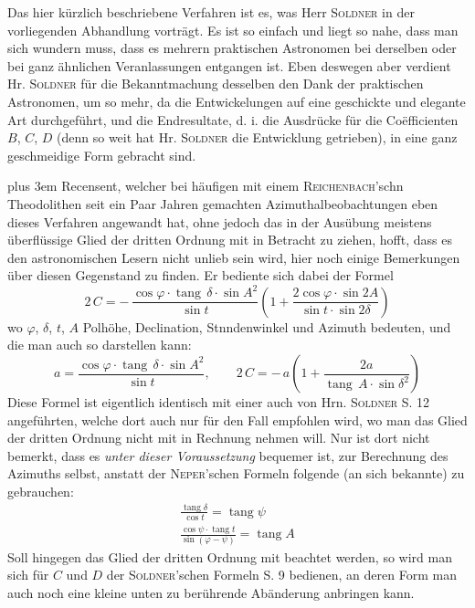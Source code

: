 Das hier kürzlich beschriebene Verfahren ist es, was Herr \textsc{Soldner} in der vorliegenden Abhandlung vorträgt. Es ist so einfach und liegt so nahe, dass man sich wundern muss, dass es mehrern praktischen Astronomen bei derselben oder bei ganz ähnlichen Veranlassungen entgangen ist. Eben deswegen aber verdient Hr. \textsc{Soldner} für die Bekanntmachung desselben den Dank der praktischen Astronomen, um so mehr, da die Entwickelungen auf eine geschickte und elegante Art durchgeführt, und die Endresultate, d. i. die Ausdrücke für die Coëfficienten $B$, $C$, $D$ (denn so weit hat Hr. \textsc{Soldner} die Entwicklung getrieben), in eine ganz geschmeidige Form gebracht sind.

\begingroup\rightskip=0pt plus 3em
Recensent, welcher bei häufigen mit einem \textsc{Reichenbach}'schn
 Theodolithen seit ein Paar Jahren gemachten Azimuthalbeobachtungen eben dieses Verfahren angewandt hat, ohne jedoch das in der Ausübung meistens überflüssige Glied der dritten Ordnung mit in Betracht zu ziehen, hofft, dass es den astronomischen Lesern nicht unlieb sein wird, hier noch einige Bemerkungen über diesen Gegenstand zu finden. Er bediente sich dabei der Formel
\[
2\,C = -\,\frac{\cos\varphi\cdot \operatorname{tang}\,\delta\cdot \sin A^2}{\sin t}
\left(1 + \frac{2\cos\varphi\cdot \sin 2A}{\sin t\cdot \sin 2\delta}\right)
\]
wo $\varphi$, $\delta$, $t$, $A$ Polhöhe, Declination, Stnndenwinkel
 und Azimuth bedeuten, und die man auch so darstellen kann:
\[
a = \frac{\cos\varphi\cdot \operatorname{tang}\,\delta\cdot \sin A^2}{\sin t}, \qquad
2\,C = -\,a\left(1 + \frac{2a}{\operatorname{tang}\,A\cdot \sin\delta^2}\right)
\]
Diese Formel ist eigentlich identisch mit einer auch von Hrn. \textsc{Soldner} S. 12 angeführten, welche dort auch nur für den Fall empfohlen wird, wo man das Glied der dritten Ordnung nicht mit in Rechnung nehmen will. Nur ist dort nicht bemerkt, dass es \emph{unter dieser Voraussetzung} bequemer ist, zur Berechnung des Azimuths selbst, anstatt der \textsc{Neper}'schen Formeln folgende (an sich bekannte) zu gebrauchen:
\[
\begin{gathered}
\frac{\operatorname{tang}\delta}{\cos t}=\operatorname{tang}\psi\\[5pt]
\frac{\cos\psi\cdot\operatorname{tang}t}{\sin(\varphi-\psi)}=\operatorname{tang}A
\end{gathered}
\]
Soll hingegen das Glied der dritten Ordnung mit beachtet werden, so wird man sich für $C$ und $D$ der \textsc{Soldner}'schen Formeln S. 9 bedienen, an deren Form man auch noch eine kleine unten zu berührende Abänderung anbringen kann.\par\endgroup

